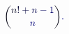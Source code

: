 \documentclass[12pt]{article}
\begin{document}
\makeatletter
\renewcommand*{\@textcolor}[3]{%
  \protect\leavevmode
  \begingroup
    \color#1{#2}#3%
  \endgroup
}
\makeatother
\begin{displaymath}
\mathcolor[RGB]{0,0,15}{\binom { \mathcolor[RGB]{0,0,30}{n} \mathcolor[RGB]{0,0,45}{!} \mathcolor[RGB]{0,0,60}{+} \mathcolor[RGB]{0,0,75}{n} \mathcolor[RGB]{0,0,90}{-} \mathcolor[RGB]{0,0,105}{1} } { \mathcolor[RGB]{0,0,120}{n} } } \mathcolor[RGB]{0,0,135}{.}
\end{displaymath}
\end{document}

